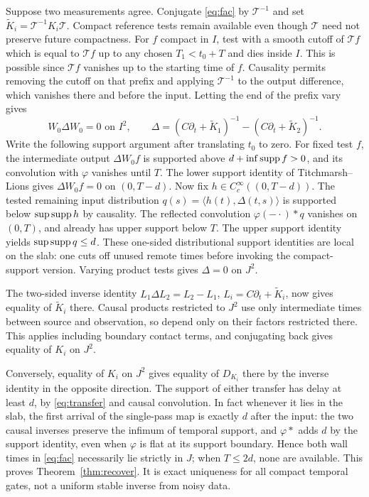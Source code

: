 Suppose two measurements agree. Conjugate \eqref{eq:fac} by \(\mathcal T^{-1}\) and set \(\widetilde K_i=\mathcal T^{-1}K_i\mathcal T\). Compact reference tests remain available even though \(\mathcal T\) need not preserve future compactness. For \(f\) compact in \(I\), test with a smooth cutoff of \(\mathcal T f\) which is equal to \(\mathcal T f\) up to any chosen \(T_1<t_0+T\) and dies inside \(I\). This is possible since \(\mathcal T f\) vanishes up to the starting time of \(f\). Causality permits removing the cutoff on that prefix and applying \(\mathcal T^{-1}\) to the output difference, which vanishes there and before the input. Letting the end of the prefix vary gives
\[
        W_0 \Delta W_0=0\text{ on }I^2,\qquad
   \Delta=(C\partial_t+\widetilde K_1)^{-1}-
                 (C\partial_t+\widetilde K_2)^{-1}.
\]
Write the following support argument after translating \(t_0\) to zero. For fixed test \(f\), the intermediate output \(\Delta W_0 f\) is supported above \(d+\inf\operatorname{supp} f>0\), and its convolution with \(\varphi\) vanishes until \(T\). The lower support identity of Titchmarsh--Lions \cite{Lions} gives \(\Delta W_0 f=0\) on \((0,T-d)\). Now fix \(h\in C_c^\infty((0,T-d))\). The tested remaining input distribution \(q(s)=\langle h(t),\Delta(t,s)\rangle\) is supported below \(\sup\operatorname{supp} h\) by causality. The reflected convolution \(\varphi(-\cdot)*q\) vanishes on \((0,T)\), and already has upper support below \(T\). The upper support identity yields \(\sup\operatorname{supp} q\le d\). These one-sided distributional support identities are local on the slab: one cuts off unused remote times before invoking the compact-support version. Varying product tests gives \(\Delta=0\) on \(J^2\).

The two-sided inverse identity \(L_1\Delta L_2=L_2-L_1\), \(L_i=C\partial_t+\widetilde K_i\), now gives equality of \(\widetilde K_i\) there. Causal products restricted to \(J^2\) use only intermediate times between source and observation, so depend only on their factors restricted there. This applies including boundary contact terms, and conjugating back gives equality of \(K_i\) on \(J^2\).

Conversely, equality of \(K_i\) on \(J^2\) gives equality of \(D_{K_i}\) there by the inverse identity in the opposite direction. The support of either transfer has delay at least \(d\), by \eqref{eq:transfer} and causal convolution. In fact whenever it lies in the slab, the first arrival of the single-pass map is exactly \(d\) after the input: the two causal inverses preserve the infimum of temporal support, and \(\varphi*\) adds \(d\) by the support identity, even when \(\varphi\) is flat at its support boundary. Hence both wall times in \eqref{eq:fac} necessarily lie strictly in \(J\); when \(T\le2d\), none are available. This proves Theorem~\ref{thm:recover}. It is exact uniqueness for all compact temporal gates, not a uniform stable inverse from noisy data.


